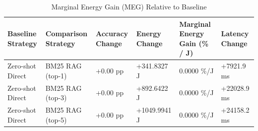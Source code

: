 \begin{table}
\caption{Marginal Energy Gain (MEG) Relative to Baseline}
\label{tab:marginal_energy_gain}
\begin{tabular}{llllll}
\toprule
Baseline Strategy & Comparison Strategy & Accuracy Change & Energy Change & Marginal Energy Gain (\% / J) & Latency Change \\
\midrule
Zero-shot Direct & BM25 RAG (top-1) & +0.00 pp & +341.8327 J & 0.0000 \%/J & +7921.9 ms \\
Zero-shot Direct & BM25 RAG (top-3) & +0.00 pp & +892.6422 J & 0.0000 \%/J & +22028.9 ms \\
Zero-shot Direct & BM25 RAG (top-5) & +0.00 pp & +1049.9941 J & 0.0000 \%/J & +24158.2 ms \\
\bottomrule
\end{tabular}
\end{table}

